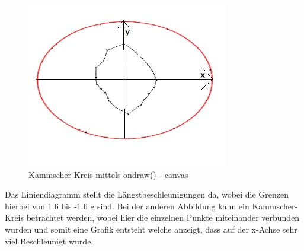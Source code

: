 \begin{figure}[!tbp]
\begin{minipage}[b]{0.4\textwidth}
 		\includegraphics[width=\textwidth]{images/Kammscherkreis-u}
 		\caption{Kammscher Kreis mittels ondraw() - canvas}
 	\end{minipage}
\end{figure}


Das Liniendiagramm stellt die Längstbeschleunigungen da, wobei die Grenzen hierbei von 1.6 bis -1.6 g sind.
Bei der anderen Abbildung kann ein Kammscher-Kreis betrachtet werden, wobei hier die einzelnen Punkte miteinander verbunden wurden und somit eine Grafik entsteht welche anzeigt, dass auf der x-Achse sehr viel Beschleunigt wurde.

\clearpage %